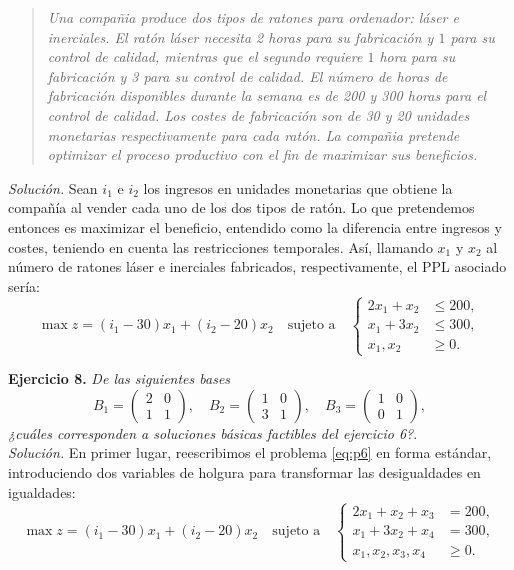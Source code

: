 \documentclass[11pt,a4paper]{article}
\begin{document}
\begin{quote}
\textit{Una compañia produce dos tipos de ratones para ordenador: láser e inerciales. El ratón láser necesita 2 horas para su fabricación y $1$ para su control de calidad, mientras que el segundo requiere $1$ hora para su fabricación y 3 para su control de calidad. El número de horas de fabricación disponibles durante la semana es de 200 y 300 horas para el control de calidad. Los costes de fabricación son de 30 y 20 unidades monetarias respectivamente para cada ratón. La compañia pretende optimizar el proceso productivo con el fin de maximizar sus beneficios.}
\end{quote}

\textit{Solución.} Sean $i_1$ e $i_2$ los ingresos en unidades monetarias que obtiene la compañía al vender cada uno de los dos tipos de ratón. Lo que pretendemos entonces es maximizar el beneficio, entendido como la diferencia entre ingresos y costes, teniendo en cuenta las restricciones temporales. Así, llamando $x_1$ y $x_2$ al número de ratones láser e inerciales fabricados, respectivamente, el PPL asociado sería:
\begin{equation}\tag{P6}\label{eq:p6}
  \max z = (i_1-30)x_{1} + (i_2-20)x_{2} \quad \text{sujeto a} \quad \begin{cases} 2x_{1} + x_{2} &\leq 200,\\ x_{1} + 3x_{2} &\leq 300,\\ x_{1}, x_{2} &\geq 0. \end{cases}
\end{equation}

\textbf{Ejercicio 8.} \emph{De las siguientes bases}
\[
  B_{1} = \begin{pmatrix} 2 & 0 \\ 1 & 1 \end{pmatrix},\quad  B_{2} = \begin{pmatrix} 1 & 0 \\ 3 & 1 \end{pmatrix}, \quad B_{3} = \begin{pmatrix} 1 & 0 \\ 0 & 1 \end{pmatrix},
\]
\emph{¿cuáles corresponden a soluciones básicas factibles del ejercicio 6?}.\\

\textit{Solución.} En primer lugar, reescribimos el problema \eqref{eq:p6} en forma estándar, introduciendo dos variables de holgura para transformar las desigualdades en igualdades:
\[
  \max z = (i_1-30)x_{1} + (i_2-20)x_{2} \quad \text{sujeto a} \quad \begin{cases} 2x_{1} + x_{2} +x_3 &= 200,\\ x_{1} + 3x_{2} + x_4 &= 300,\\ x_{1}, x_{2}, x_3, x_4 &\geq 0. \end{cases}
\]
\end{document}
